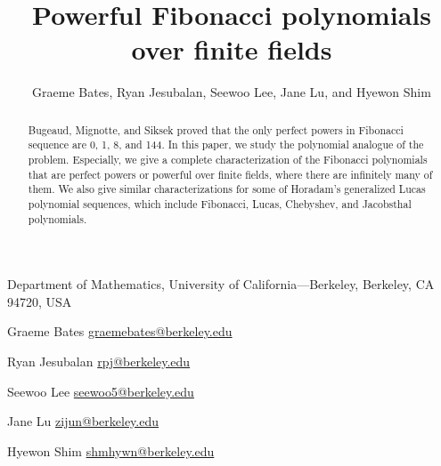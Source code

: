 \documentclass[letterpaper, 10pt]{article}
\begin{document}

\title{Powerful Fibonacci polynomials over finite fields}


\author{Graeme Bates, Ryan Jesubalan, Seewoo Lee, Jane Lu, and Hyewon Shim}
\date{}


\maketitle



\begin{abstract}
    Bugeaud, Mignotte, and Siksek proved that the only perfect powers in Fibonacci sequence are 0, 1, 8, and 144.
    In this paper, we study the polynomial analogue of the problem. Especially, we give a complete characterization of the Fibonacci polynomials that are perfect powers or powerful over finite fields, where there are infinitely many of them.
    We also give similar characterizations for some of Horadam's generalized Lucas polynomial sequences, which include Fibonacci, Lucas, Chebyshev, and Jacobsthal polynomials.
\end{abstract}





% 






\newpage

\medskip

{Department of Mathematics, University of California---Berkeley, Berkeley, CA 94720, USA}

Graeme Bates \href{mailto:graemebates@berkeley.edu}{graemebates@berkeley.edu}

Ryan Jesubalan \href{mailto:rpj@berkeley.edu}{rpj@berkeley.edu}

Seewoo Lee \href{mailto:seewoo5@berkeley.edu}{seewoo5@berkeley.edu}

Jane Lu \href{mailto:zijun@berkeley.edu}{zijun@berkeley.edu}

Hyewon Shim \href{mailto:shmhywn@berkeley.edu}{shmhywn@berkeley.edu}


\end{document}
